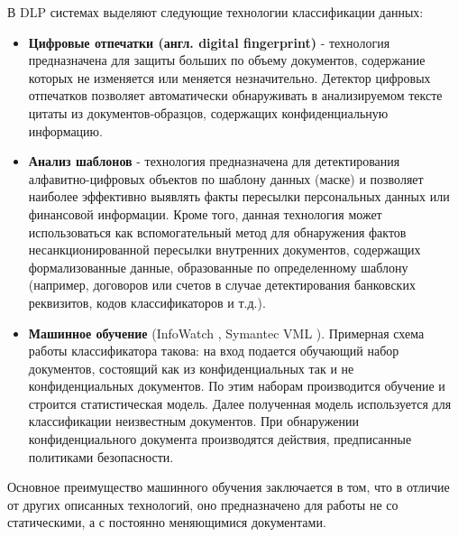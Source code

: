 \documentclass[russian, utf8, emptystyle]{eskdtext}
\begin{document}
В DLP системах выделяют следующие технологии классификации данных:
\begin{itemize}
	\item {\bf Цифровые отпечатки (англ. digital fingerprint)} - технология предназначена для защиты больших по объему документов, содержание которых не изменяется или меняется незначительно. Детектор цифровых отпечатков позволяет автоматически обнаруживать в анализируемом тексте цитаты из документов-образцов, содержащих конфиденциальную информацию.
	\item {\bf Анализ шаблонов} - технология предназначена для детектирования алфавитно-цифровых объектов по шаблону данных (маске) и позволяет наиболее эффективно выявлять факты пересылки персональных данных или финансовой информации. Кроме того, данная технология может использоваться как вспомогательный метод для обнаружения фактов несанкционированной пересылки внутренних документов, содержащих формализованные данные, образованные по определенному шаблону (например, договоров или счетов в случае детектирования банковских реквизитов, кодов классификаторов и т.д.).
	\item {\bf Машинное обучение} (InfoWatch \cite{bkf}, Symantec VML \cite{MachLearn}). Примерная схема работы классификатора такова: на вход подается обучающий набор документов, состоящий как из конфиденциальных так и не конфиденциальных документов. По этим наборам производится обучение и строится статистическая модель. Далее полученная модель используется для классификации неизвестным документов. При обнаружении конфиденциального документа производятся действия, предписанные политиками безопасности.
\end{itemize}

Основное преимущество машинного обучения заключается в том, что в отличие от других описанных технологий, оно предназначено для работы не со статическими, а с постоянно меняющимися документами.\\
\end{document}
